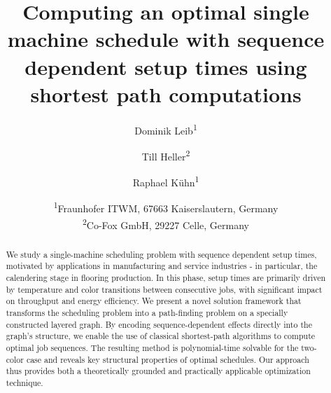\documentclass{article}
\title{Computing an optimal single machine schedule with sequence dependent setup times using shortest path computations}
\author{Dominik Leib\textsuperscript{1} \and Till Heller\textsuperscript{2} \and Raphael Kühn\textsuperscript{1}}
\date{\textsuperscript{1}Fraunhofer ITWM, 67663 Kaiserslautern, Germany\\
\phantom{0}\textsuperscript{2}Co-Fox GmbH, 29227 Celle, Germany}
\theoremstyle{definition}
\begin{document}
\maketitle

\begin{abstract}

We study a single-machine scheduling problem with sequence dependent setup times, motivated by applications in manufacturing and service industries - in particular, the calendering stage in flooring production. In this phase, setup times are primarily driven by temperature and color transitions between consecutive jobs, with significant impact on throughput and energy efficiency. We present a novel solution framework that transforms the scheduling problem into a path-finding problem on a specially constructed layered graph. By encoding sequence-dependent effects directly into the graph’s structure, we enable the use of classical shortest-path algorithms to compute optimal job sequences. The resulting method is polynomial-time solvable for the two-color case and reveals key structural properties of optimal schedules. Our approach thus provides both a theoretically grounded and practically applicable optimization technique.
\end{abstract}
\end{document}
